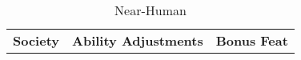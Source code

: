 

\begin{table}[ht]
\caption{Near-Human}
\begin{adjustbox}{width=\columnwidth,center}
\begin{tabular}{l l l}
\textbf{Society} &\textbf{Ability Adjustments} & \textbf{Bonus Feat}\\


\end{tabular}
\end{adjustbox}
\end{table}
